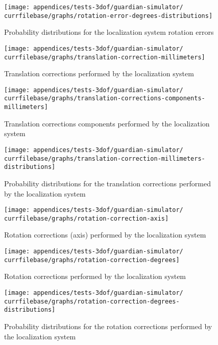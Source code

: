 \begin{figure}[H]
	\centering
	\texttt{[image: appendices/tests-3dof/guardian-simulator/\\currfilebase/graphs/rotation-error-degrees-distributions]}
	\caption{Probability distributions for the localization system rotation errors}
\end{figure}


\begin{figure}[H]
	\centering
	\texttt{[image: appendices/tests-3dof/guardian-simulator/\\currfilebase/graphs/translation-correction-millimeters]}
	\caption{Translation corrections performed by the localization system}
\end{figure}

\begin{figure}[H]
	\centering
	\texttt{[image: appendices/tests-3dof/guardian-simulator/\\currfilebase/graphs/translation-corrections-components-millimeters]}
	\caption{Translation corrections components performed by the localization system}
\end{figure}

\begin{figure}[H]
	\centering
	\texttt{[image: appendices/tests-3dof/guardian-simulator/\\currfilebase/graphs/translation-correction-millimeters-distributions]}
	\caption{Probability distributions for the translation corrections performed by the localization system}
\end{figure}


\begin{figure}[H]
	\centering
	\texttt{[image: appendices/tests-3dof/guardian-simulator/\\currfilebase/graphs/rotation-correction-axis]}
	\caption{Rotation corrections (axis) performed by the localization system}
\end{figure}

\begin{figure}[H]
	\centering
	\texttt{[image: appendices/tests-3dof/guardian-simulator/\\currfilebase/graphs/rotation-correction-degrees]}
	\caption{Rotation corrections performed by the localization system}
\end{figure}

\begin{figure}[H]
	\centering
	\texttt{[image: appendices/tests-3dof/guardian-simulator/\\currfilebase/graphs/rotation-correction-degrees-distributions]}
	\caption{Probability distributions for the rotation corrections performed by the localization system}
\end{figure}


